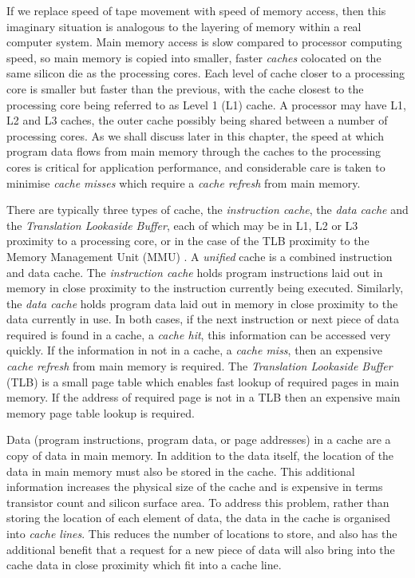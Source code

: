 If we replace speed of tape movement with speed of memory access, then this imaginary situation is analogous to the layering of memory within a real computer system. Main memory access is slow compared to processor computing speed, so main memory is copied into smaller, faster \emph{caches} colocated on the same silicon die as the processing cores. Each level of cache closer to a processing core is smaller but faster than the previous, with the cache closest to the processing core being referred to as Level 1 (L1) cache. A processor may have L1, L2 and L3 caches, the outer cache possibly being shared between a number of processing cores. As we shall discuss later in this chapter, the speed at which program data flows from main memory through the caches to the processing cores is critical for application performance, and considerable care is taken to minimise \emph{cache misses} which require a \emph{cache refresh} from main memory.

There are typically three types of cache, the \emph{instruction cache}, the \emph{data cache} and the \emph{Translation Lookaside Buffer}, each of which may be in L1, L2 or L3 proximity to a processing core, or in the case of the TLB proximity to the Memory Management Unit (MMU) . A \emph{unified} cache is a combined instruction and data cache. The \emph{instruction cache} holds program instructions laid out in memory in close proximity to the instruction currently being executed. Similarly, the \emph{data cache} holds program data laid out in memory in close proximity to the data currently in use. In both cases, if the next instruction or next piece of data required is found in a cache, a \emph{cache hit}, this information can be accessed very quickly. If the information in not in a cache, a \emph{cache miss}, then an expensive \emph{cache refresh} from main memory is required. The \emph{Translation Lookaside Buffer} (TLB) is a small page table which enables fast lookup of required pages in main memory. If the address of required page is not in a TLB then an expensive main memory page table lookup is required.   

Data (program instructions, program data, or page addresses) in a cache are a copy of data in main memory. In addition to the data itself, the location of the data in main memory must also be stored in the cache. This additional information increases the physical size of the cache and is expensive in terms transistor count and silicon surface area. To address this problem, rather than storing the location of each element of data, the data in the cache is organised into \emph{cache lines}. This reduces the number of locations to store, and also has the additional benefit that a request for a new piece of data will also bring into the cache data in close proximity which fit into a cache line.

